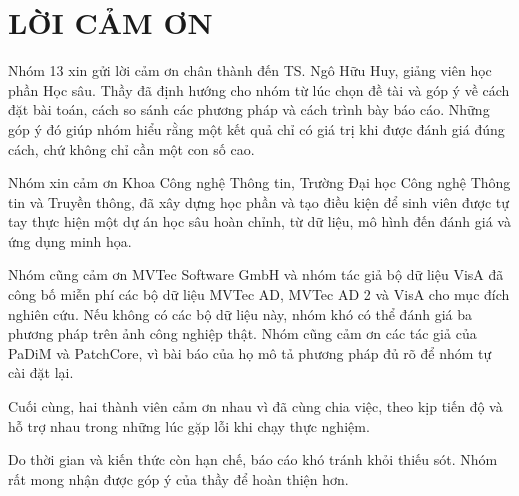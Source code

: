 \chapter*{LỜI CẢM ƠN}

Nhóm 13 xin gửi lời cảm ơn chân thành đến TS. Ngô Hữu Huy, giảng viên học phần Học sâu. Thầy đã định hướng cho nhóm
từ lúc chọn đề tài và góp ý về cách đặt bài toán, cách so sánh các phương pháp và cách trình bày báo cáo. Những góp ý
đó giúp nhóm hiểu rằng một kết quả chỉ có giá trị khi được đánh giá đúng cách, chứ không chỉ cần một con số cao.

Nhóm xin cảm ơn Khoa Công nghệ Thông tin, Trường Đại học Công nghệ Thông tin và Truyền thông, đã xây dựng học phần và
tạo điều kiện để sinh viên được tự tay thực hiện một dự án học sâu hoàn chỉnh, từ dữ liệu, mô hình đến đánh giá và
ứng dụng minh họa.

Nhóm cũng cảm ơn MVTec Software GmbH và nhóm tác giả bộ dữ liệu VisA đã công bố miễn phí các bộ dữ liệu MVTec AD,
MVTec AD 2 và VisA cho mục đích nghiên cứu. Nếu không có các bộ dữ liệu này, nhóm khó có thể đánh giá ba phương pháp
trên ảnh công nghiệp thật. Nhóm cũng cảm ơn các tác giả của PaDiM và PatchCore, vì bài báo của họ mô tả phương pháp đủ
rõ để nhóm tự cài đặt lại.

Cuối cùng, hai thành viên cảm ơn nhau vì đã cùng chia việc, theo kịp tiến độ và hỗ trợ nhau trong những lúc gặp lỗi
khi chạy thực nghiệm.

Do thời gian và kiến thức còn hạn chế, báo cáo khó tránh khỏi thiếu sót. Nhóm rất mong nhận được góp ý của thầy để
hoàn thiện hơn.
